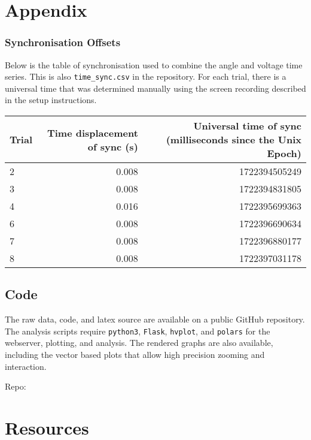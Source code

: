 \pagebreak
\section*{Appendix}


\begin{table}[h]
\subsubsection*{Synchronisation Offsets}
Below is the table of synchronisation used to combine the angle and voltage time series. This is also \verb|time_sync.csv| in the repository.
For each trial, there is a universal time that was determined manually using the screen recording described in the setup instructions.
\label{tab:SynchronisationTable}
\begin{center}
\begin{tabular}{|l|r|r|}

\hline
Trial & Time displacement of sync (s) & Universal time of sync (milliseconds since the Unix Epoch) \\
\hline
2 & 0.008 & 1722394505249 \\
3 & 0.008 & 1722394831805 \\
4 & 0.016 & 1722395699363 \\
6 & 0.008 & 1722396690634 \\
7 & 0.008 & 1722396880177 \\
8 & 0.008 & 1722397031178 \\
\hline
\end{tabular}

\end{center}
\end{table}

\subsection*{Code}

The raw data, code, and latex source are available on a public GitHub repository.
The analysis scripts require \verb|python3|, \verb|Flask|, \verb|hvplot|, and \verb|polars| for the webserver, plotting, and analysis.
The rendered graphs are also available, including the vector based plots that allow high precision zooming and interaction.

Repo: \href{https://github*.com/TunaMaestro/phys1241_final_lab.git}{}


\section*{Resources}


